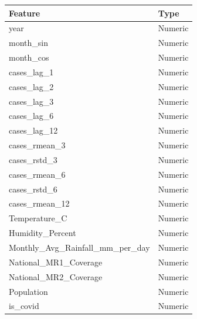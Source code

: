 \begin{tabular}{ll}
\toprule
Feature & Type \\
\midrule
year & Numeric \\
month_sin & Numeric \\
month_cos & Numeric \\
cases_lag_1 & Numeric \\
cases_lag_2 & Numeric \\
cases_lag_3 & Numeric \\
cases_lag_6 & Numeric \\
cases_lag_12 & Numeric \\
cases_rmean_3 & Numeric \\
cases_rstd_3 & Numeric \\
cases_rmean_6 & Numeric \\
cases_rstd_6 & Numeric \\
cases_rmean_12 & Numeric \\
Temperature_C & Numeric \\
Humidity_Percent & Numeric \\
Monthly_Avg_Rainfall_mm_per_day & Numeric \\
National_MR1_Coverage & Numeric \\
National_MR2_Coverage & Numeric \\
Population & Numeric \\
is_covid & Numeric \\
\bottomrule
\end{tabular}
